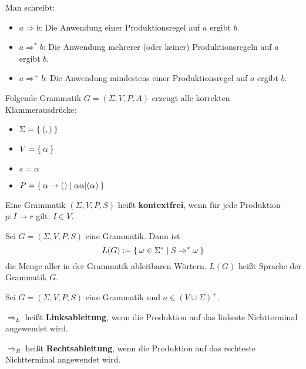 Man schreibt:

\begin{itemize}
	\item $a \Rightarrow b$: Die Anwendung einer Produktionsregel auf $a$ ergibt $b$.
	\item $a \Rightarrow^* b$: Die Anwendung mehrerer (oder keiner) Produktionsregeln auf
	$a$ ergibt $b$.
	\item $a \Rightarrow^+ b$: Die Anwendung mindestens einer Produktionsregel auf $a$
	ergibt $b$.
\end{itemize}

\begin{beispiel}
	Folgende Grammatik $G = (\Sigma, V, P, A)$ erzeugt alle korrekten Klammerausdrücke:

	\begin{itemize}
		\item $\Sigma = \Set{(, )}$
		\item $V = \Set{\alpha}$
		\item $s = \alpha$
		\item $P = \Set{\alpha \rightarrow () | \alpha \alpha | (\alpha)}$
	\end{itemize}
\end{beispiel}

\begin{definition}%
	Eine Grammatik $(\Sigma, V, P, S)$ heißt \textbf{kontextfrei}, wenn für
	jede Produktion $p: I \rightarrow r$ gilt: $I \in V$.
\end{definition}

\begin{definition}[Sprache]%
	Sei $G = (\Sigma, V, P, S)$ eine Grammatik. Dann ist
	\[L(G) := \Set{\omega \in \Sigma^* | S \Rightarrow^* \omega}\]
	die Menge aller in der Grammatik ableitbaren Wörtern. $L(G)$ heißt Sprache
	der Grammatik $G$.
\end{definition}

\begin{definition}%
    Sei $G = (\Sigma, V, P, S)$ eine Grammatik und $a \in (V \cup \Sigma)^+$.
    \begin{defenum}
        \item $\Rightarrow_L$ heißt \textbf{Linksableitung}, wenn die Produktion
              auf das linkeste Nichtterminal angewendet wird.
        \item $\Rightarrow_R$ heißt \textbf{Rechtsableitung}, wenn die Produktion
              auf das rechteste Nichtterminal angewendet wird.
    \end{defenum}
\end{definition}

